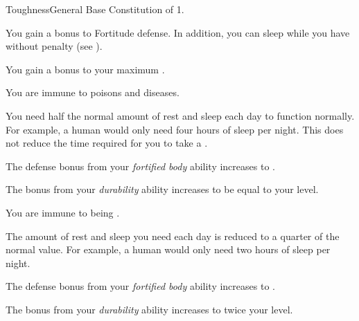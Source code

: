     \begin{feat}{Toughness}{General}
        \featpre Base Constitution of 1.

         You gain a  bonus to Fortitude defense.
        In addition, you can sleep while you have  without penalty (see ).

         You gain a  bonus to your maximum .

         You are immune to poisons and diseases.

         You need half the normal amount of rest and sleep each day to function normally.
        For example, a human would only need four hours of sleep per night.
        This does not reduce the time required for you to take a .

         The defense bonus from your \textit{fortified body} ability increases to .

         The bonus from your \textit{durability} ability increases to be equal to your level.

         You are immune to being \paralyzed.

         The amount of rest and sleep you need each day is reduced to a quarter of the normal value.
        For example, a human would only need two hours of sleep per night.

         The defense bonus from your \textit{fortified body} ability increases to .

         The bonus from your \textit{durability} ability increases to twice your level.
    \end{feat}

